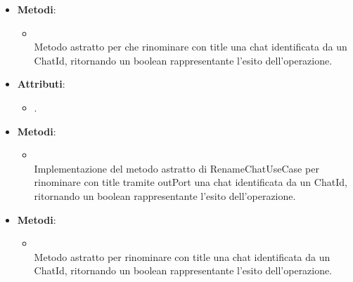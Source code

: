 \documentclass[10pt, a4paper]{article}
\begin{document}
\label{RenameChatUseCaseDettaglio}
\begin{itemize}
    \item \textbf{Metodi}:
    \begin{itemize}
        \item {}\\
        Metodo astratto per che rinominare con title una chat identificata da un ChatId, ritornando un boolean rappresentante l'esito dell'operazione.
    \end{itemize}
\end{itemize}

\label{RenameChatServiceDettaglio}
\begin{itemize}
    \item \textbf{Attributi}:
    \begin{itemize}
        \item {}.
    \end{itemize}
    \item \textbf{Metodi}:
    \begin{itemize}
        \item {}\\
        Implementazione del metodo astratto di RenameChatUseCase per rinominare con title tramite outPort una chat identificata da un ChatId, ritornando un boolean rappresentante l'esito dell'operazione.
    \end{itemize}
\end{itemize}

\label{RenameChatPortDettaglio}
\begin{itemize}
    \item \textbf{Metodi}:
    \begin{itemize}
        \item {}\\
        Metodo astratto per rinominare con title una chat identificata da un ChatId, ritornando un boolean rappresentante l'esito dell'operazione.
    \end{itemize}
\end{itemize}
\end{document}
